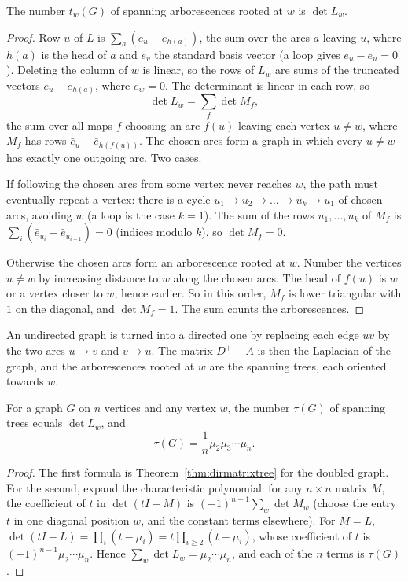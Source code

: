 \begin{theorem}\label{thm:dirmatrixtree}
The number $t_w(G)$ of spanning arborescences rooted at $w$ is $\det L_w$.
\end{theorem}
\begin{proof}
Row $u$ of $L$ is $\sum_{a}(e_u-e_{h(a)})$, the sum over the arcs $a$ leaving $u$, where $h(a)$ is the head of $a$ and $e_v$ the standard basis vector (a loop gives
$e_u-e_u=0$). Deleting the column of $w$ is linear, so the rows of $L_w$ are sums of the truncated vectors $\bar e_u-\bar e_{h(a)}$, where $\bar e_w=0$. The determinant is linear in each
row, so
\[
\det L_w=\sum_f\det M_f,
\]
the sum over all maps $f$ choosing an arc $f(u)$ leaving each vertex $u\ne w$, where $M_f$ has rows $\bar e_u-\bar e_{h(f(u))}$. The chosen arcs form a graph in which every $u\ne w$ has exactly one
outgoing arc. Two cases.

If following the chosen arcs from some vertex never reaches $w$, the path must eventually repeat a vertex: there is a cycle $u_1\to u_2\to\dots\to u_k\to u_1$ of chosen arcs, avoiding $w$ (a loop
is the case $k=1$). The sum of the rows $u_1,\dots,u_k$ of $M_f$ is $\sum_i(\bar e_{u_i}-\bar e_{u_{i+1}})=0$ (indices modulo $k$), so $\det M_f=0$.

Otherwise the chosen arcs form an arborescence rooted at $w$. Number the vertices $u\ne w$ by increasing distance to $w$ along the chosen arcs. The head of $f(u)$ is
$w$ or a vertex closer to $w$, hence earlier. So in this order, $M_f$ is lower triangular with $1$ on the diagonal, and $\det M_f=1$. The sum counts the arborescences.
\end{proof}

An undirected graph is turned into a directed one by replacing each edge $uv$ by the two arcs $u\to v$ and $v\to u$. The matrix $D^+-A$ is then the Laplacian of
the graph, and the arborescences rooted at $w$ are the spanning trees, each oriented towards $w$.

\begin{corollary}[Kirchhoff, 1847]\label{cor:kirchhoff}
For a graph $G$ on $n$ vertices and any vertex $w$, the number $\tau(G)$ of spanning trees equals $\det L_w$, and
\[
\tau(G)=\frac1n\mu_2\mu_3\cdots\mu_n.
\]
\end{corollary}
\begin{proof}
The first formula is Theorem~\ref{thm:dirmatrixtree} for the doubled graph. For the second, expand the characteristic polynomial: for any $n\times n$ matrix $M$, the coefficient of
$t$ in $\det(tI-M)$ is $(-1)^{n-1}\sum_w\det M_w$ (choose the entry $t$ in one diagonal position $w$, and the constant terms elsewhere). For $M=L$, $\det(tI-L)=\prod_i(t-\mu_i)=t\prod_{i\ge2}(t-\mu_i)$, whose
coefficient of $t$ is $(-1)^{n-1}\mu_2\cdots\mu_n$. Hence $\sum_w\det L_w=\mu_2\cdots\mu_n$, and each of the $n$ terms is $\tau(G)$.
\end{proof}


